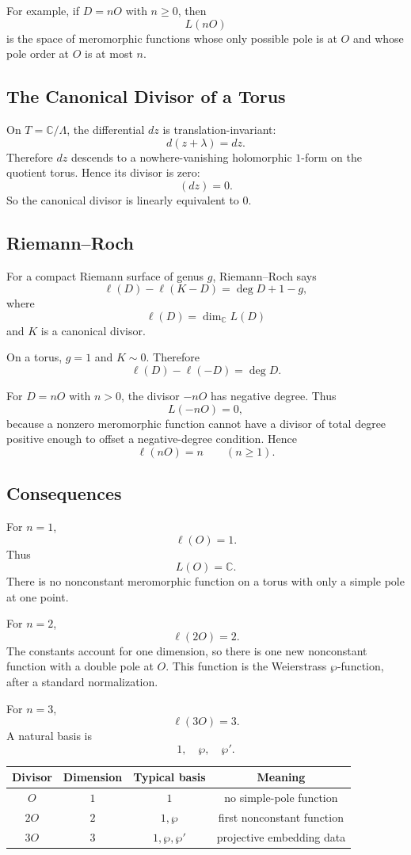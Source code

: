 \documentclass[11pt]{article}
\newcommand{\C}{\mathbb{C}}
\begin{document}
For example, if \(D=nO\) with \(n\geq0\), then
\[
L(nO)
\]
is the space of meromorphic functions whose only possible pole is at \(O\)
and whose pole order at \(O\) is at most \(n\).

\subsection{The Canonical Divisor of a Torus}

On \(T=\C/\Lambda\), the differential \(dz\) is translation-invariant:
\[
d(z+\lambda)=dz.
\]
Therefore \(dz\) descends to a nowhere-vanishing holomorphic \(1\)-form on
the quotient torus.  Hence its divisor is zero:
\[
(dz)=0.
\]
So the canonical divisor is linearly equivalent to \(0\).

\subsection{Riemann--Roch}

For a compact Riemann surface of genus \(g\), Riemann--Roch says
\[
\ell(D)-\ell(K-D)=\deg D+1-g,
\]
where
\[
\ell(D)=\dim_\C L(D)
\]
and \(K\) is a canonical divisor.

On a torus, \(g=1\) and \(K\sim0\).  Therefore
\[
\ell(D)-\ell(-D)=\deg D.
\]

For \(D=nO\) with \(n>0\), the divisor \(-nO\) has negative degree.  Thus
\[
L(-nO)=0,
\]
because a nonzero meromorphic function cannot have a divisor of total degree
positive enough to offset a negative-degree condition.  Hence
\[
\ell(nO)=n
\qquad
(n\geq1).
\]

\subsection{Consequences}

For \(n=1\),
\[
\ell(O)=1.
\]
Thus
\[
L(O)=\C.
\]
There is no nonconstant meromorphic function on a torus with only a simple
pole at one point.

For \(n=2\),
\[
\ell(2O)=2.
\]
The constants account for one dimension, so there is one new nonconstant
function with a double pole at \(O\).  This function is the Weierstrass
\(\wp\)-function, after a standard normalization.

For \(n=3\),
\[
\ell(3O)=3.
\]
A natural basis is
\[
1,\quad \wp,\quad \wp'.
\]

\begin{center}
\begin{tabular}{c|c|c|c}
Divisor & Dimension & Typical basis & Meaning\\
\hline
\(O\) & \(1\) & \(1\) & no simple-pole function\\
\(2O\) & \(2\) & \(1,\wp\) & first nonconstant function\\
\(3O\) & \(3\) & \(1,\wp,\wp'\) & projective embedding data
\end{tabular}
\end{center}
\end{document}
